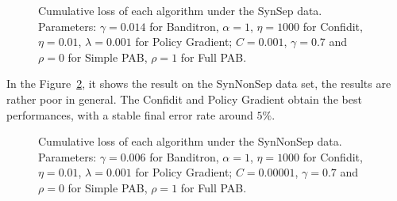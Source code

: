 \begin{figure}[!h]
\vspace{.2in}
\caption{Cumulative loss of each algorithm under the SynSep data. Parameters: $\gamma = 0.014$ for Banditron, $\alpha=1$, $\eta=1000$ for Confidit, $\eta =0.01$, $\lambda = 0.001$ for Policy Gradient; $C = 0.001$, $\gamma = 0.7$ and $\rho = 0$ for Simple PAB, $\rho = 1$ for Full PAB.}
\label{pic:PABSynSep}
\end{figure} 

In the Figure~\ref{pic:PABSynNonSep}, it shows the result on the SynNonSep data set, the results are rather poor in general. The Confidit and Policy Gradient \cite{Dauce13fast} obtain the best performances, with a stable final error rate around $5\%$. 
\begin{figure}[!h]
\vspace{.2in}
\caption{Cumulative loss of each algorithm under the SynNonSep data. Parameters: $\gamma = 0.006$ for Banditron, $\alpha=1$, $\eta=1000$ for Confidit, $\eta =0.01$, $\lambda = 0.001$ for Policy Gradient; $C = 0.00001$, $\gamma = 0.7$ and $\rho = 0$ for Simple PAB, $\rho = 1$ for Full PAB.}
\label{pic:PABSynNonSep}
\end{figure}

